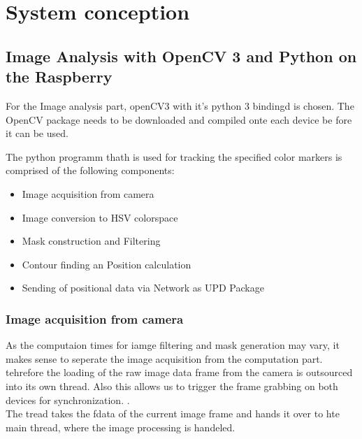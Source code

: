 \chapter{System conception}
\section{Image Analysis with OpenCV 3 and Python on the Raspberry}
For the Image analysis part, openCV3 with it's python 3 bindingd is chosen. The OpenCV package needs to be downloaded and compiled onte each device be fore it can be used.

The python programm thath is used for tracking the specified color markers is comprised of the following components:
\begin{itemize}
\item Image acquisition from camera
\item Image conversion to HSV colorspace
\item Mask construction and Filtering
\item Contour finding an Position calculation
\item Sending of positional data via Network as UPD Package
\end{itemize}

\subsection{Image acquisition from camera}
As the computaion times for iamge filtering and mask generation may vary, it makes sense to seperate the image acquisition from the computation part. tehrefore the loading of the raw image data frame from the camera is outsourced into its own thread. Also this allows us to trigger the frame grabbing on both devices for synchronization. .
\\The tread takes the fdata of the current image frame and hands it over to hte main thread, where the image processing is handeled.

